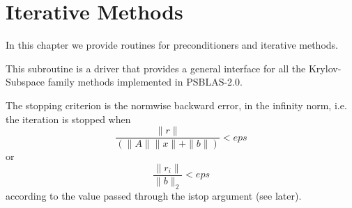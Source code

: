 \section{Iterative Methods}
\label{sec:methods}

In this chapter we provide routines for preconditioners and iterative
methods. 

%
%


This subroutine is a driver that provides a general interface for all
the Krylov-Subspace family methods implemented in PSBLAS-2.0. 

The stopping criterion is the normwise backward error, in the infinity
norm, i.e. the iteration is stopped when 
\[ \frac{\|r\|}{(\|A\|\|x\|+\|b\|)} < eps \]
or
\[ \frac{\|r_i\|}{\|b\|_2} < eps \]
according to the value passed through the  istop argument (see later).



